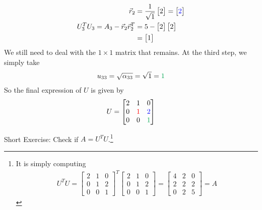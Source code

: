 \begin{solution}
\begin{align*}
\vec{r}_2 &= \frac{1}{\sqrt{1}}
\begin{bmatrix}
2
\end{bmatrix}
=
\begin{bmatrix}
\textcolor{blue}{2}
\end{bmatrix} \\
U_3^T U_3 = A_3  - \vec{r}_2\vec{r}_2^T &=
5 - 
\begin{bmatrix}
2
\end{bmatrix}
\begin{bmatrix}
2
\end{bmatrix} \\
&= 
\begin{bmatrix}
1
\end{bmatrix}
\end{align*}
We still need to deal with the $1 \times 1$ matrix that remains. At the third step, we simply take
\begin{align*}
u_{33} = \sqrt{\alpha_{33}} = \sqrt{1} = \textcolor{Green}{1}
\end{align*}
So the final expression of $U$ is given by
\begin{align*}
U = 
\begin{bmatrix}
2 & 1 & 0 \\
0 & \textcolor{red}{1} & \textcolor{blue}{2} \\
0 & 0 & \textcolor{Green}{1}
\end{bmatrix}
\end{align*}
\end{solution}
Short Exercise: Check if $A = U^T U$.\footnote{It is simply computing
\begin{align*}
U^TU = 
\begin{bmatrix}
2 & 1 & 0 \\
0 & 1 & 2 \\
0 & 0 & 1
\end{bmatrix}^T
\begin{bmatrix}
2 & 1 & 0 \\
0 & 1 & 2 \\
0 & 0 & 1
\end{bmatrix} =
\begin{bmatrix}
4 & 2 & 0 \\
2 & 2 & 2 \\
0 & 2 & 5 
\end{bmatrix} = A
\end{align*}
}\par
